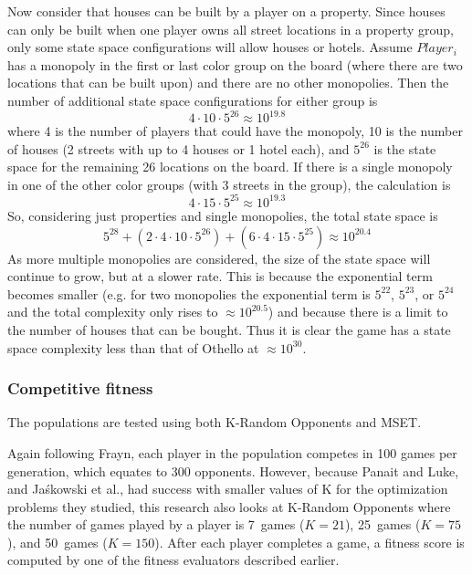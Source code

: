 Now consider that houses can be built by a player on a property. Since houses
can only be built when one player owns all street locations in a property group,
only some state space configurations will allow houses or hotels. Assume
\(Player_{i}\) has a monopoly in the first or last color group on the board
(where there are two locations that can be built upon) and there are no other
monopolies. Then the number of additional state space configurations for either
group is
\begin{equation*}
4 \cdot 10 \cdot 5^{26} \approx 10^{19.8}
\end{equation*}
where 4 is the number of players that could have the monopoly, 10 is the number
of houses (2 streets with up to 4 houses or 1 hotel each), and \(5^{26}\) is the
state space for the remaining 26 locations on the board. If there is a single monopoly
in one of the other color groups (with 3 streets in the group), the
calculation is
\begin{equation*}
4 \cdot 15 \cdot 5^{25} \approx 10^{19.3}
\end{equation*}
So, considering just properties and single monopolies, the total state space
is
\begin{equation*}
5^{28} + (2 \cdot 4 \cdot 10 \cdot 5^{26}) + (6 \cdot 4 \cdot 15 \cdot 5^{25})
\approx 10^{20.4}
\end{equation*}
As more multiple monopolies are considered, the size of the state space will continue to
grow, but at a slower rate. This is because the exponential term becomes smaller
(e.g. for two monopolies the exponential term is \(5^{22}\), \(5^{23}\), or
\(5^{24}\) and the total complexity only rises to \(\approx10^{20.5}\)) and
because there is a limit to the number of houses that can be bought. Thus it is
clear the game has a state space complexity less than that of Othello at
\(\approx10^{30}\).

\subsubsection{Competitive fitness} \label{5_compfit}

The populations are tested using both K-Random Opponents and MSET.

Again following Frayn, each player in the population competes in 100 games per
generation, which equates to 300 opponents. However, because Panait and Luke,
and Ja\'{s}kowski et al., had success with smaller values of K for the
optimization problems they studied, this research also looks at K-Random
Opponents where the number of games played by a player is 7~games (\(K=21\)),
25~games (\(K=75\)), and 50~games (\(K=150\)). After each player completes a
game, a fitness score is computed by one of the fitness evaluators described
earlier.

